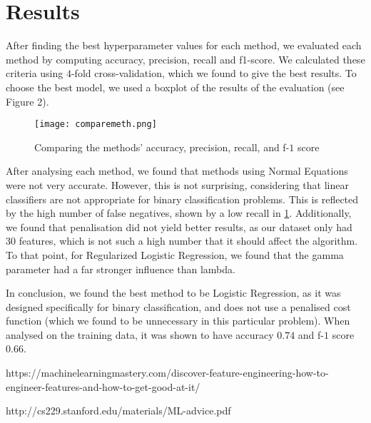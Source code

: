 \documentclass{article}
\begin{document}
	
	\section{Results}
	After finding the best hyperparameter values for each method, we evaluated each method by computing accuracy, precision, recall and f1-score. We calculated these criteria using $4$-fold cross-validation, which we found to give the best results. To choose the best model, we used a boxplot of the results of the evaluation (see Figure 2).
	
	\begin{figure}[h]
		\centering
		\texttt{[image: comparemeth.png]}
		\caption{Comparing the methods' accuracy, precision, recall, and f-$1$ score}\label{boxplot}
	\end{figure}
	
	After analysing each method, we found that methods using Normal Equations were not very accurate. However, this is not surprising, considering that linear classifiers are not appropriate for binary classification problems. This is reflected by the high number of false negatives, shown by a low recall in \ref{boxplot}. Additionally, we found that penalisation did not yield better results, as our dataset only had $30$ features, which is not such a high number that it should affect the algorithm. To that point, for Regularized Logistic Regression, we found that the gamma parameter had a far stronger influence than lambda.
	
	In conclusion, we found the best method to be Logistic Regression, as it was designed specifically for binary classification, and does not use a penalised cost function (which we found to be unnecessary in this particular problem). When analysed on the training data, it was shown to have accuracy $0.74$ and f-$1$ score $0.66$.
	
	\begin{thebibliography}{9}
		 https://machinelearningmastery.com/discover-feature-engineering-how-to-engineer-features-and-how-to-get-good-at-it/
		
		 http://cs229.stanford.edu/materials/ML-advice.pdf
	\end{thebibliography}
\end{document}
